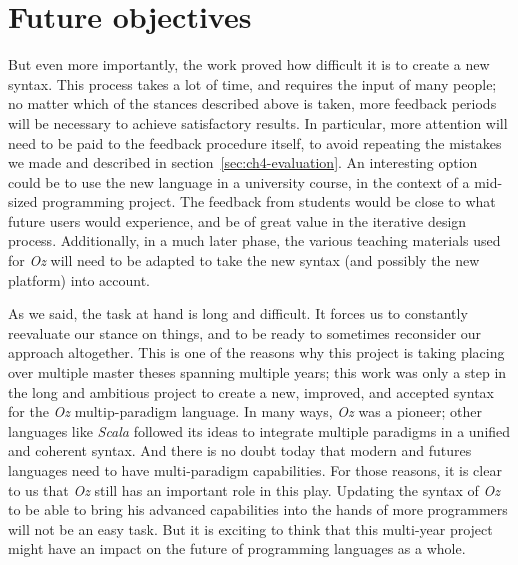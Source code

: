 \section{Future objectives}\label{sec:ch5-future-objectives}
But even more importantly, the work proved how difficult it is to create a new syntax.
This process takes a lot of time, and requires the input of many people;
no matter which of the stances described above is taken, more feedback periods will be necessary to achieve satisfactory results.
In particular, more attention will need to be paid to the feedback procedure itself, to avoid repeating the mistakes we made and described in section~\ref{sec:ch4-evaluation}.
An interesting option could be to use the new language in a university course, in the context of a mid-sized programming project.
The feedback from students would be close to what future users would experience, and be of great value in the iterative design process.
Additionally, in a much later phase, the various teaching materials used for \textit{Oz} will need to be adapted to take the new syntax (and possibly the new platform) into account.\newline

As we said, the task at hand is long and difficult.
It forces us to constantly reevaluate our stance on things, and to be ready to sometimes reconsider our approach altogether.
This is one of the reasons why this project is taking placing over multiple master theses spanning multiple years;
this work was only a step in the long and ambitious project to create a new, improved, and accepted syntax for the \textit{Oz} multip-paradigm language.
In many ways, \textit{Oz} was a pioneer;
other languages like \textit{Scala} followed its ideas to integrate multiple paradigms in a unified and coherent syntax.
And there is no doubt today that modern and futures languages need to have multi-paradigm capabilities.
For those reasons, it is clear to us that \textit{Oz} still has an important role in this play.\newline
Updating the syntax of \textit{Oz} to be able to bring his advanced capabilities into the hands of more programmers will not be an easy task.
But it is exciting to think that this multi-year project might have an impact on the future of programming languages as a whole.
